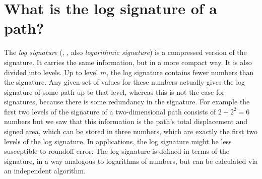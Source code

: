 \section{What is the log signature of a path?}
\label{sec:logsigs}
The \emph{log signature} (\cite{Sidorova}, \cite{Lyons07}, also \emph{logarithmic signature}) is a compressed version of the signature. 
It carries the same information, but in a more compact way. 
It is also divided into levels. 
Up to level $m$, the log signature contains fewer numbers than the signature.
Any given set of values for these numbers actually gives the log signature of some path up to that level, whereas 
this is not the case for signatures, because there is some redundancy in the signature.
For example the first two levels of the signature of a two-dimensional path consists of $2+2^2=6$ numbers but we saw that this information is the path's total displacement and signed area, which can be stored in three numbers, which are exactly the first two levels of the log signature. In applications, the log signature might be less susceptible to roundoff error. The log signature is defined in terms of the signature, in a way analogous to logarithms of numbers, but can be calculated via an independent algorithm.

 
